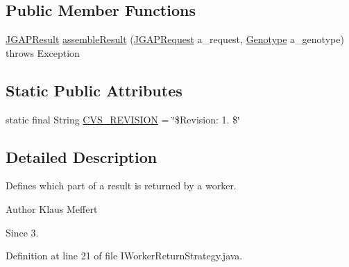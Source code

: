 \subsection*{Public Member Functions}
\begin{DoxyCompactItemize}
\item 
\hyperlink{classorg_1_1jgap_1_1distr_1_1grid_1_1_j_g_a_p_result}{J\-G\-A\-P\-Result} \hyperlink{interfaceorg_1_1jgap_1_1distr_1_1grid_1_1_i_worker_return_strategy_ae3e75f2acf490467850d40419ada0447}{assemble\-Result} (\hyperlink{classorg_1_1jgap_1_1distr_1_1grid_1_1_j_g_a_p_request}{J\-G\-A\-P\-Request} a\-\_\-request, \hyperlink{classorg_1_1jgap_1_1_genotype}{Genotype} a\-\_\-genotype)  throws Exception
\end{DoxyCompactItemize}
\subsection*{Static Public Attributes}
\begin{DoxyCompactItemize}
\item 
static final String \hyperlink{interfaceorg_1_1jgap_1_1distr_1_1grid_1_1_i_worker_return_strategy_ad2ede78cb6c13fb02b87fbb208864c45}{C\-V\-S\-\_\-\-R\-E\-V\-I\-S\-I\-O\-N} = \char`\"{}\$Revision\-: 1. \$\char`\"{}
\end{DoxyCompactItemize}


\subsection{Detailed Description}
Defines which part of a result is returned by a worker.

\begin{DoxyAuthor}{Author}
Klaus Meffert 
\end{DoxyAuthor}
\begin{DoxySince}{Since}
3. 
\end{DoxySince}


Definition at line 21 of file I\-Worker\-Return\-Strategy.\-java.



